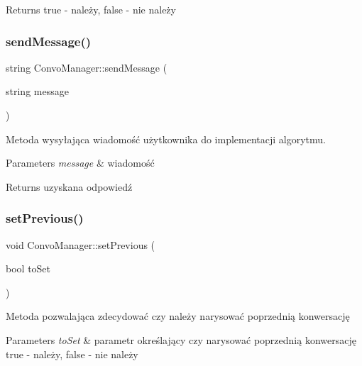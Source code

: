 \begin{DoxyReturn}{Returns}
true -\/ należy, false -\/ nie należy 
\end{DoxyReturn}
\mbox{\label{class_convo_manager_ab748892188c5b958497203bd6876861b}} 
\subsubsection{\texorpdfstring{sendMessage()}{sendMessage()}}
{\footnotesize\ttfamily string Convo\+Manager\+::send\+Message (\begin{DoxyParamCaption}\item[{string}]{message }\end{DoxyParamCaption})}



Metoda wysyłająca wiadomość użytkownika do implementacji algorytmu. 


\begin{DoxyParams}{Parameters}
{\em message} & wiadomość \\
\hline
\end{DoxyParams}
\begin{DoxyReturn}{Returns}
uzyskana odpowiedź 
\end{DoxyReturn}
\mbox{\label{class_convo_manager_a1fe9e8f09c59c7043ac51185c6728fb7}} 
\subsubsection{\texorpdfstring{setPrevious()}{setPrevious()}}
{\footnotesize\ttfamily void Convo\+Manager\+::set\+Previous (\begin{DoxyParamCaption}\item[{bool}]{to\+Set }\end{DoxyParamCaption})\hspace{0.3cm}{\ttfamily [inline]}}



Metoda pozwalająca zdecydować czy należy narysować poprzednią konwersację 


\begin{DoxyParams}{Parameters}
{\em to\+Set} & parametr określający czy narysować poprzednią konwersację true -\/ należy, false -\/ nie należy \\
\hline
\end{DoxyParams}
\mbox{\label{class_convo_manager_af9f80e4f664a20b9042753d659d13c0e}} 

